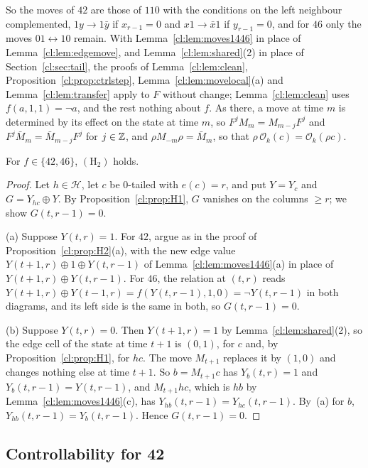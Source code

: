 So the moves of $42$ are those of $110$ with the conditions on the left neighbour complemented, $1y\to1\bar y$ if $x_{r-1}=0$ and $x1\to\bar x1$ if $y_{r-1}=0$, and for $46$ only the moves $01\leftrightarrow10$ remain. With Lemma~\ref{cl:lem:moves1446} in place of Lemma~\ref{cl:lem:edgemove}, and Lemma~\ref{cl:lem:shared}(2) in place of Section~\ref{cl:sec:tail}, the proofs of Lemma~\ref{cl:lem:clean}, Proposition~\ref{cl:prop:ctrlstep}, Lemma~\ref{cl:lem:movelocal}(a) and Lemma~\ref{cl:lem:transfer} apply to $F$ without change; Lemma~\ref{cl:lem:clean} uses $f(a,1,1)=\neg a$, and the rest nothing about $f$. As there, a move at time $m$ is determined by its effect on the state at time $m$, so $F^jM_m=M_{m-j}F^j$ and $F^j\bar M_m=\bar M_{m-j}F^j$ for $j\in\mathbb{Z}$, and $\rho M_{-m}\rho=\bar M_m$, so that $\rho\,\mathcal O_k(c)=\mathcal O_k(\rho c)$.

\begin{proposition}\label{cl:prop:H2b}
For $f\in\{42,46\}$, $(\mathrm H_2)$ holds.
\end{proposition}

\begin{proof}
Let $h\in\mathcal H$, let $c$ be $0$-tailed with $e(c)=r$, and put $Y=Y_c$ and $G=Y_{hc}\oplus Y$. By Proposition~\ref{cl:prop:H1}, $G$ vanishes on the columns $\ge r$; we show $G(t,r-1)=0$.

(a) Suppose $Y(t,r)=1$. For $42$, argue as in the proof of Proposition~\ref{cl:prop:H2}(a), with the new edge value $Y(t+1,r)\oplus1\oplus Y(t,r-1)$ of Lemma~\ref{cl:lem:moves1446}(a) in place of $Y(t+1,r)\oplus Y(t,r-1)$. For $46$, the relation at $(t,r)$ reads $Y(t+1,r)\oplus Y(t-1,r)=f(Y(t,r-1),1,0)=\neg Y(t,r-1)$ in both diagrams, and its left side is the same in both, so $G(t,r-1)=0$.

(b) Suppose $Y(t,r)=0$. Then $Y(t+1,r)=1$ by Lemma~\ref{cl:lem:shared}(2), so the edge cell of the state at time $t+1$ is $(0,1)$, for $c$ and, by Proposition~\ref{cl:prop:H1}, for $hc$. The move $M_{t+1}$ replaces it by $(1,0)$ and changes nothing else at time $t+1$. So $b=M_{t+1}c$ has $Y_b(t,r)=1$ and $Y_b(t,r-1)=Y(t,r-1)$, and $M_{t+1}hc$, which is $hb$ by Lemma~\ref{cl:lem:moves1446}(c), has $Y_{hb}(t,r-1)=Y_{hc}(t,r-1)$. By~(a) for $b$, $Y_{hb}(t,r-1)=Y_b(t,r-1)$. Hence $G(t,r-1)=0$.
\end{proof}

\subsection{Controllability for 42}\label{cl:sec:42}

